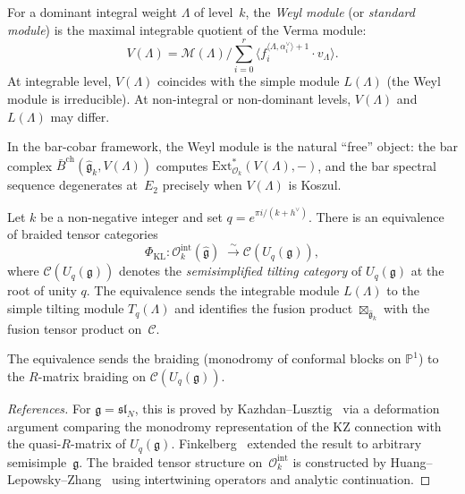 \begin{definition}\label{def:weyl-module}
For a dominant integral weight $\Lambda$ of level~$k$, the
\emph{Weyl module} (or \emph{standard module}) is the maximal
integrable quotient of the Verma module:
\[
V(\Lambda) = \mathcal{M}(\Lambda) \Big/ \sum_{i=0}^r
\langle f_i^{\langle\Lambda, \alpha_i^\vee\rangle + 1}
\cdot v_\Lambda \rangle.
\]
At integrable level, $V(\Lambda)$ coincides with the simple module
$L(\Lambda)$ (the Weyl module is irreducible). At non-integral or
non-dominant levels, $V(\Lambda)$ and $L(\Lambda)$ may differ.

In the bar-cobar framework, the Weyl module is the natural
``free'' object: the bar complex
$\bar{B}^{\mathrm{ch}}(\widehat{\mathfrak{g}}_k, V(\Lambda))$
computes $\mathrm{Ext}^*_{\mathcal{O}_k}(V(\Lambda), -)$, and the
bar spectral sequence degenerates at~$E_2$ precisely when
$V(\Lambda)$ is Koszul.
\end{definition}

\begin{theorem}
\label{thm:kazhdan-lusztig-equivalence}
Let $k$ be a non-negative integer and set
$q = e^{\pi i/(k + h^\vee)}$. There is an equivalence of
braided tensor categories
\begin{equation}\label{eq:kl-equivalence}
\Phi_{\mathrm{KL}} \colon
\mathcal{O}_k^{\mathrm{int}}(\widehat{\mathfrak{g}})
\;\xrightarrow{\;\sim\;}
\mathcal{C}(U_q(\mathfrak{g})),
\end{equation}
where $\mathcal{C}(U_q(\mathfrak{g}))$ denotes the
\emph{semisimplified tilting category} of $U_q(\mathfrak{g})$
at the root of unity $q$. The equivalence sends the integrable
module $L(\Lambda)$ to the simple tilting module
$T_q(\Lambda)$ and identifies the fusion product
$\boxtimes_{\widehat{\mathfrak{g}}_k}$ with the fusion tensor
product on~$\mathcal{C}$.

The equivalence sends the braiding
\textup{(}monodromy of conformal blocks on $\mathbb{P}^1$\textup{)}
to the $R$-matrix braiding on $\mathcal{C}(U_q(\mathfrak{g}))$.
\end{theorem}

\begin{proof}[References]
For $\mathfrak{g} = \mathfrak{sl}_N$, this is proved
by Kazhdan--Lusztig~\cite{KL93} via a deformation argument
comparing the monodromy representation of the KZ connection
with the quasi-$R$-matrix of $U_q(\mathfrak{g})$.
Finkelberg~\cite{Finkelberg96} extended the result to arbitrary
semisimple~$\mathfrak{g}$. The braided tensor structure
on~$\mathcal{O}_k^{\mathrm{int}}$ is constructed
by Huang--Lepowsky--Zhang~\cite{HLZ} using intertwining
operators and analytic continuation.
\end{proof}

